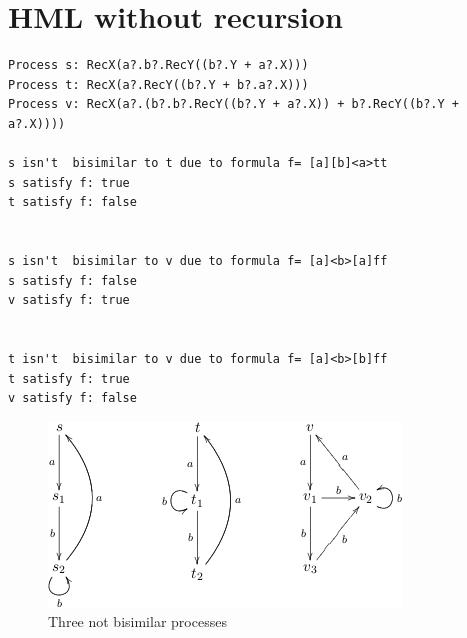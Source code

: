
\section{HML without recursion}

\begin{verbatim}
Process s: RecX(a?.b?.RecY((b?.Y + a?.X)))
Process t: RecX(a?.RecY((b?.Y + b?.a?.X)))
Process v: RecX(a?.(b?.b?.RecY((b?.Y + a?.X)) + b?.RecY((b?.Y + a?.X))))

s isn't  bisimilar to t due to formula f= [a][b]<a>tt
s satisfy f: true
t satisfy f: false


s isn't  bisimilar to v due to formula f= [a]<b>[a]ff
s satisfy f: false
v satisfy f: true


t isn't  bisimilar to v due to formula f= [a]<b>[b]ff
t satisfy f: true
v satisfy f: false
\end{verbatim}

\begin{figure}[htb]
  \centering
  \includegraphics{qualitative-project/not-bisimilar-processes.png}
  \caption{Three not bisimilar processes}
  \label{fig:not-bisimilar-processes}
\end{figure}
